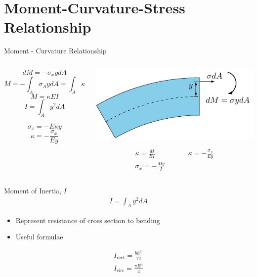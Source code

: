 \documentclass[10pt, svgnames]{beamer}
\begin{document}
\section{Moment-Curvature-Stress Relationship}
\label{moment-curvature-stress-relationship}
\begin{frame}[label={sec:org4f8e70f}]{Moment - Curvature Relationship}
\begin{columns}
\begin{column}{0.4\columnwidth}
\[dM = - \sigma_x y dA\]
\[M = - \int_A \sigma_A y dA = \int_A \kappa E y^2 dA\]
\[M = \kappa E I\] \[I = \int_A y^2 dA\]

\[\sigma_x = - E\kappa y\] \[\kappa = - \frac{ \sigma_x }{Ey}\]
\end{column}

\begin{column}{0.6\columnwidth}
\begin{center}
\includegraphics[width=.9\linewidth]{pictures/moment-curvature.pdf}
\end{center}

\begin{gather*}
      \kappa = \frac{M}{EI} \hspace{2cm} \kappa = -\frac{\sigma_{x}}{Ey} \\
      \sigma_{x} = -\frac{My}{I}
\end{gather*}
\end{column}
\end{columns}
\end{frame}

\begin{frame}[label={sec:orgac5c1f6}]{Moment of Inertia, \(I\)}
\begin{align*}
    I = \int_{A} y^{2}dA
\end{align*}

\begin{itemize}
\item Represent resistance of cross section to bending

\item Useful formulae
\end{itemize}

\begin{align*}
  I_{\text{rect}} = \frac{bh^{3}}{12} \\
  I_{\text{circ}}= \frac{\pi R^{4}}{4}
\end{align*}
\end{frame}
\end{document}
